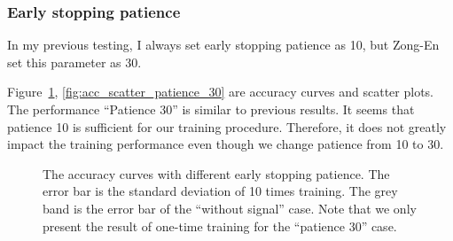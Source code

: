 \documentclass[12pt]{article}
\begin{document}
		\subsubsection{Early stopping patience}%
		\label{subs:early_stopping_patience}
			In my previous testing, I always set early stopping patience as 10, but Zong-En set this parameter as 30.

			Figure~\ref{fig:acc_curve_patience_30}, \ref{fig:acc_scatter_patience_30} are accuracy curves and scatter plots. The performance ``Patience 30'' is similar to previous results. It seems that patience 10 is sufficient for our training procedure. Therefore, it does not greatly impact the training performance even though we change patience from 10 to 30.
			\begin{figure}[htpb]
				\centering
				\caption{The accuracy curves with different early stopping patience. The error bar is the standard deviation of 10 times training. The grey band is the error bar of the ``without signal'' case. Note that we only present the result of one-time training for the ``patience 30'' case.}
				\label{fig:acc_curve_patience_30}
			\end{figure}
\end{document}
